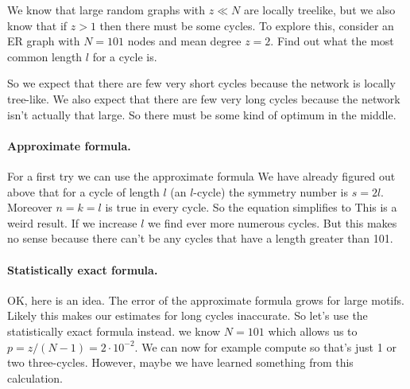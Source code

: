 We know that large random graphs with $z\ll N$ are locally treelike, but we also know that if $z>1$ then there must be some cycles. To explore this, consider an ER graph with $N=101$ nodes and mean degree $z=2$. Find out what the most common length $l$ for a cycle is. 

\solution 
So we expect that there are few very short cycles because the network is locally tree-like. We also expect that there are few very long cycles because the network isn't actually that large. So there must be some kind of optimum in the middle. 
\paragraph{Approximate formula.}For a first try we can use the approximate formula 
We have already figured out above that for a cycle of length $l$ (an $l$-cycle) the symmetry number is $s=2l$. Moreover $n=k=l$ is true in every cycle. So the equation simplifies to 
This is a weird result. If we increase $l$ we find ever more numerous cycles. But this makes no sense because there can't be any cycles that have a length greater than 101. 
\paragraph{Statistically exact formula.} OK, here is an idea. The error of the approximate formula grows for large motifs. Likely this makes our estimates for long cycles inaccurate. So let's use the statistically exact formula instead.  
we know $N=101$ which allows us to $p=z/(N-1)=2\cdot 10^{-2}$. We can now for example compute 
so that's just 1 or two three-cycles. However, maybe we have learned something from this calculation. 
